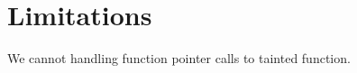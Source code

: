 \section{Limitations}
\label{sec:limitations}
We cannot handling function pointer calls to tainted function.
